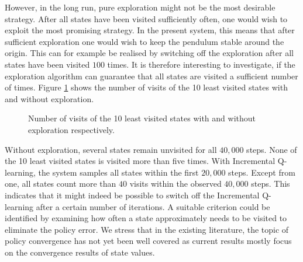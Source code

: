 \documentclass[../main.tex]{subfiles}
\begin{document}
However, in the long run, pure exploration might not be the most desirable strategy. After all states have been visited sufficiently often, one would wish to exploit the most promising strategy. In the present system, this means that after sufficient exploration one would wish to keep the pendulum stable around the origin. This can for example be realised by switching off the exploration after all states have been visited $100$ times. It is therefore interesting to investigate, if the exploration algorithm can guarantee that all states are visited a sufficient number of times. Figure \ref{fig:leastvisited} shows the number of visits of the 10 least visited states with and without exploration. 
\begin{figure}[H]
    \centering
        \caption{Number of visits of the 10 least visited states with and without exploration respectively.}  \label{fig:leastvisited}
\end{figure}
Without exploration, several states remain unvisited for all $40,000$ steps. None of the 10 least visited states is visited more than five times. With Incremental Q-learning, the system samples all states within the first $20,000$ steps. Except from one, all states count more than $40$ visits within the observed $40,000$ steps. This indicates that it might indeed be possible to switch off the Incremental Q-learning after a certain number of iterations. A suitable criterion could be identified by examining how often a state approximately needs to be visited to eliminate the policy error. We stress that in the existing literature, the topic of policy convergence has not yet been well covered as current results mostly focus on the convergence results of state values. \par
\end{document}
